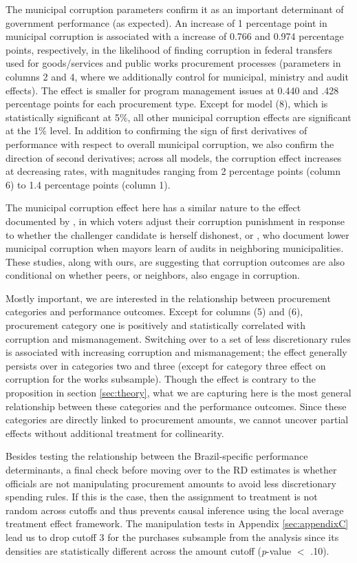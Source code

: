 \documentclass[11pt]{article}
\begin{document}
The municipal corruption parameters confirm it as an important determinant of government performance (as expected). An increase of 1 percentage point in municipal corruption is associated with a increase of 0.766 and 0.974 percentage points, respectively, in the likelihood of finding corruption in federal transfers used for goods/services and public works procurement processes (parameters in columns 2 and 4, where we additionally control for municipal, ministry and audit effects). The effect is smaller for program management issues at 0.440 and .428 percentage points for each procurement type. Except for model (8), which is statistically significant at 5\%, all other municipal corruption effects are significant at the 1\% level. In addition to confirming the sign of first derivatives of performance with respect to overall municipal corruption, we also confirm the direction of second derivatives; across all models, the corruption effect increases at decreasing rates, with magnitudes ranging from 2 percentage points (column 6) to 1.4 percentage points (column 1).

The municipal corruption effect here has a similar nature to the effect documented by \citet{ChongDoesCorruptionInformation2015}, in which voters adjust their corruption punishment in response to whether the challenger candidate is herself dishonest, or \citet{FinanGovernmentAuditsReduce2018}, who document lower municipal corruption when mayors learn of audits in neighboring municipalities. These studies, along with ours, are suggesting that corruption outcomes are also conditional on whether peers, or neighbors, also engage in corruption.

Mostly important, we are interested in the relationship between procurement categories and performance outcomes. Except for columns (5) and (6), procurement category one is positively and statistically correlated with corruption and mismanagement. Switching over to a set of less discretionary rules is associated with increasing corruption and mismanagement; the effect generally persists over in categories two and three (except for category three effect on corruption for the works subsample). Though the effect is contrary to the proposition in section \ref{sec:theory}, what we are capturing here is the most general relationship between these categories and the performance outcomes. Since these categories are directly linked to procurement amounts, we cannot uncover partial effects without additional treatment for collinearity.

Besides testing the relationship between the Brazil-specific performance determinants, a final check before moving over to the RD estimates is whether officials are not manipulating procurement amounts to avoid less discretionary spending rules. If this is the case, then the assignment to treatment is not random across cutoffs and thus prevents causal inference using the local average treatment effect framework. The manipulation tests in Appendix \ref{sec:appendixC} lead us to drop cutoff 3 for the purchases subsample from the analysis since its densities are statistically different across the amount cutoff (\emph{p}-value $<$ .10).
\end{document}
